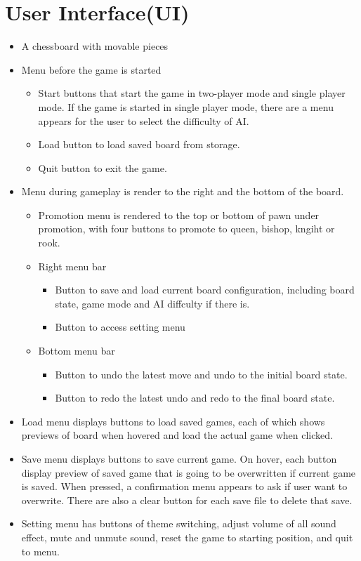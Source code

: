 \documentclass[a4paper, 10pt, titlepage]{report}
\begin{document}
\section{User Interface(UI)}
\begin{itemize}
  \item A chessboard with movable pieces

  \item Menu before the game is started
        \begin{itemize}
          \item Start buttons that start the game in two-player mode and single player mode. If the game is started in single player mode, there are a menu appears for the user to select the difficulty of AI.
          \item Load button to load saved board from storage.
          \item Quit button to exit the game.
        \end{itemize}
  \item Menu during gameplay is render to the right and the bottom of the board.
        \begin{itemize}
          \item Promotion menu is rendered to the top or bottom of pawn under promotion, with four buttons to promote to queen, bishop, kngiht or rook.
          \item Right menu bar

                \begin{itemize}
                  \item Button to save and load current board configuration, including board state, game mode and AI diffculty if there is.
                  \item Button to access setting menu
                \end{itemize}

          \item Bottom menu bar
                \begin{itemize}
                  \item Button to undo the latest move and undo to the initial board state.
                  \item Button to redo the latest undo and redo to the final board state.
                \end{itemize}
        \end{itemize}
    \item Load menu displays buttons to load saved games, each of which shows previews of board when hovered and load the actual game when clicked. 
    \item Save menu displays buttons to save current game. On hover, each button display preview of saved game that is going to be overwritten if current game is saved. When pressed, a confirmation menu appears to ask if user want to overwrite. There are also a clear button for each save file to delete that save.
    \item Setting menu has buttons of theme switching, adjust volume of all sound effect, mute and unmute sound, reset the game to starting position, and quit to menu.
\end{itemize}
\end{document}
